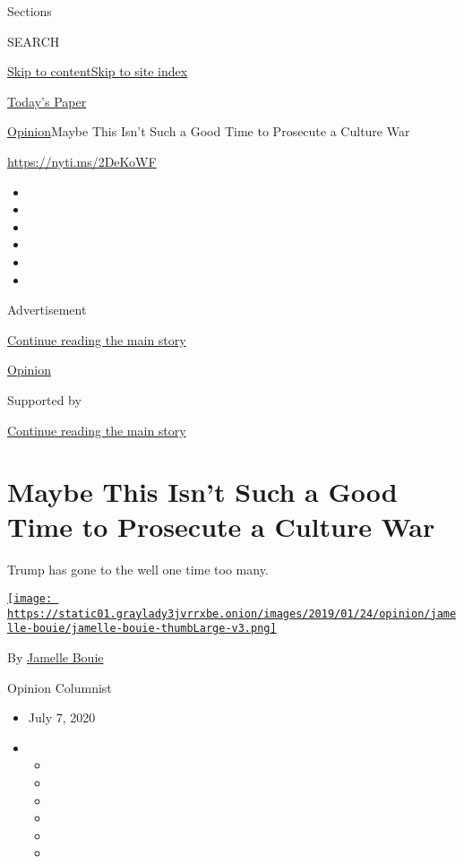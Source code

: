 Sections

SEARCH

\protect\hyperlink{site-content}{Skip to
content}\protect\hyperlink{site-index}{Skip to site index}

\href{https://myaccount.nytimes3xbfgragh.onion/auth/login?response_type=cookie\&client_id=vi}{}

\href{https://www.nytimes3xbfgragh.onion/section/todayspaper}{Today's
Paper}

\href{/section/opinion}{Opinion}\textbar{}Maybe This Isn't Such a Good
Time to Prosecute a Culture War

\href{https://nyti.ms/2DeKoWF}{https://nyti.ms/2DeKoWF}

\begin{itemize}
\item
\item
\item
\item
\item
\item
\end{itemize}

Advertisement

\protect\hyperlink{after-top}{Continue reading the main story}

\href{/section/opinion}{Opinion}

Supported by

\protect\hyperlink{after-sponsor}{Continue reading the main story}

\hypertarget{maybe-this-isnt-such-a-good-time-to-prosecute-a-culture-war}{%
\section{Maybe This Isn't Such a Good Time to Prosecute a Culture
War}\label{maybe-this-isnt-such-a-good-time-to-prosecute-a-culture-war}}

Trump has gone to the well one time too many.

\href{https://www.nytimes3xbfgragh.onion/column/jamelle-bouie}{\texttt{[image: https://static01.graylady3jvrrxbe.onion/images/2019/01/24/opinion/jamelle-bouie/jamelle-bouie-thumbLarge-v3.png]}}

By
\href{https://www.nytimes3xbfgragh.onion/column/jamelle-bouie}{Jamelle
Bouie}

Opinion Columnist

\begin{itemize}
\item
  July 7, 2020
\item
  \begin{itemize}
  \item
  \item
  \item
  \item
  \item
  \item
  \end{itemize}
\end{itemize}

